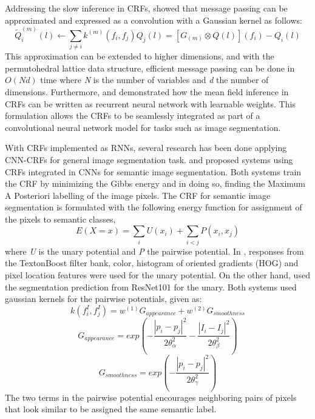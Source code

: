 \documentclass[journal]{IEEEtran}
\begin{document}
Addressing the slow inference in CRFs, \cite{NIPS2011_4296} showed that message passing can be approximated and expressed as a convolution with a Gaussian kernel as follows:
\begin{equation}
\widetilde{Q}_i^{(m)}(l)\gets \sum_{j\neq i}k^{(m)}(f_i,f_j)Q_j(l) = [G_(m) \otimes Q(l)](f_i) - Q_i(l)
\end{equation}
This approximation can be extended to higher dimensions, and with the permutohedral lattice data structure, efficient message passing can be done in $O(Nd)$ time where \textit{N} is the number of variables and \textit{d} the number of dimensions. 
Furthermore, \cite{crfasrnn_ICCV2015} and \cite{higherordercrf_ECCV2016} demonstrated how the mean field inference in CRFs can be written as recurrent neural network with learnable weights. This formulation allows the CRFs to be seamlessly integrated as part of a convolutional neural network model for tasks such as image segmentation.

With CRFs implemented as RNNs, several research has been done applying CNN-CRFs for general image segmentation task. \cite{NIPS2011_4296} and \cite{Teichmann2018ConvolutionalCF} proposed systems using CRFs integrated in CNNs for semantic image segmentation. Both systems train the CRF by minimizing the Gibbs energy and in doing so, finding the Maximum A Posteriori labelling of the image pixels. The CRF for semantic image segmentation is formulated with the following energy function for assignment of the pixels to semantic classes,
\begin{equation}
E(X = x) = \sum_i U(x_i) + \sum_{i<j}P(x_i,x_j)
\end{equation}
where \textit{U} is the unary potential and \textit{P} the pairwise potential. In \cite{NIPS2011_4296}, responses from the TextonBoost filter bank, color, histogram of oriented gradients (HOG) and pixel location features were used for the unary potential. On the other hand, \cite{Teichmann2018ConvolutionalCF} used the segmentation prediction from ResNet101 for the unary. Both systems used gaussian kernels for the pairwise potentials, given as:
\begin{equation}
k(f_i^I,f_j^I) = w^{(1)}G_{appearance} + w^{(2)}G_{smoothness}
\end{equation}
\begin{equation}
G_{appearance} = exp\left(-\frac{|p_i - p_j|^2}{2\theta_\alpha^2} - \frac{|I_i - I_j|^2}{2\theta_\beta^2}\right)
\end{equation}
\begin{equation}
G_{smoothness} = exp\left(-\frac{|p_i - p_j|^2}{2\theta_\gamma^2}\right)
\end{equation}
The two terms in the pairwise potential encourages neighboring pairs of pixels that look similar to be assigned the same semantic label.
\end{document}
